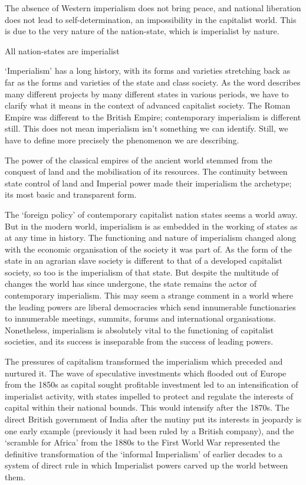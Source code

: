 The absence of Western imperialism does not bring peace, and national liberation does not lead to self-determination, an impossibility in the capitalist world.
This is due to the very nature of the nation-state, which is imperialist by nature.

All nation-states are imperialist

‘Imperialism’ has a long history, with its forms and varieties stretching back as far as the forms and varieties of the state and class society.
As the word describes many different projects by many different states in various periods, we have to clarify what it means in the context of advanced capitalist society.
The Roman Empire was different to the British Empire; contemporary imperialism is different still.
This does not mean imperialism isn’t something we can identify.
Still, we have to define more precisely the phenomenon we are describing.

The power of the classical empires of the ancient world stemmed from the conquest of land and the mobilisation of its resources.
The continuity between state control of land and Imperial power made their imperialism the archetype; its most basic and transparent form.

The ‘foreign policy’ of contemporary capitalist nation states seems a world away.
But in the modern world, imperialism is as embedded in the working of states as at any time in history.
The functioning and nature of imperialism changed along with the economic organisation of the society it was part of.
As the form of the state in an agrarian slave society is different to that of a developed capitalist society, so too is the imperialism of that state.
But despite the multitude of changes the world has since undergone, the state remains the actor of contemporary imperialism.
This may seem a strange comment in a world where the leading powers are liberal democracies which send innumerable functionaries to innumerable meetings, summits, forums and international organisations.
Nonetheless, imperialism is absolutely vital to the functioning of capitalist societies, and its success is inseparable from the success of leading powers.

The pressures of capitalism transformed the imperialism which preceded and nurtured it.
The wave of speculative investments which flooded out of Europe from the 1850s as capital sought profitable investment led to an intensification of imperialist activity, with states impelled to protect and regulate the interests of capital within their national bounds.
This would intensify after the 1870s.
The direct British government of India after the mutiny put its interests in jeopardy is one early example (previously it had been ruled by a British company), and the ‘scramble for Africa’ from the 1880s to the First World War represented the definitive transformation of the ‘informal Imperialism’ of earlier decades to a system of direct rule in which Imperialist powers carved up the world between them.

